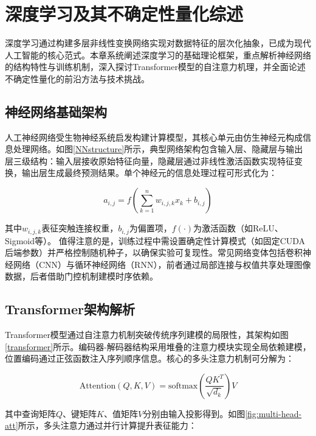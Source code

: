 \chapter{深度学习及其不确定性量化综述}

深度学习通过构建多层非线性变换网络实现对数据特征的层次化抽象，已成为现代人工智能的核心范式。本章系统阐述深度学习的基础理论框架，重点解析神经网络的结构特性与训练机制，深入探讨Transformer模型的自注意力机理，并全面论述不确定性量化的前沿方法与技术挑战。

\section{神经网络基础架构}\label{intro-NN}

人工神经网络受生物神经系统启发构建计算模型，其核心单元由仿生神经元构成信息处理网络。如图\ref{NNstructure}所示，典型网络架构包含输入层、隐藏层与输出层三级结构：输入层接收原始特征向量，隐藏层通过非线性激活函数实现特征变换，输出层生成最终预测结果。单个神经元的信息处理过程可形式化为：

\begin{equation}
    a_{i,j} = f\left(\sum_{k=1}^{n} w_{i,j,k} x_k + b_{i,j}\right)
\end{equation}

其中$w_{i,j,k}$表征突触连接权重，$b_{i,j}$为偏置项，$f(\cdot)$为激活函数（如ReLU、Sigmoid等）。
值得注意的是，训练过程中需设置确定性计算模式（如固定CUDA后端参数）并严格控制随机种子，以确保实验可复现性。常见网络变体包括卷积神经网络（CNN）与循环神经网络（RNN），前者通过局部连接与权值共享处理图像数据，后者借助门控机制建模时序依赖。

\section{Transformer架构解析}

Transformer模型通过自注意力机制突破传统序列建模的局限性，其架构如图\ref{transformer}所示。编码器-解码器结构采用堆叠的注意力模块实现全局依赖建模，位置编码通过正弦函数注入序列顺序信息。核心的多头注意力机制可分解为：

\begin{equation}
    \text{Attention}(Q,K,V) = \text{softmax}\left(\frac{QK^T}{\sqrt{d_k}}\right)V
\end{equation}

其中查询矩阵$Q$、键矩阵$K$、值矩阵$V$分别由输入投影得到。如图\ref{fig:multi-head-att}所示，多头注意力通过并行计算提升表征能力：

